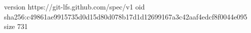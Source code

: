 version https://git-lfs.github.com/spec/v1
oid sha256:c49861ae9915735d0d15d80d078b17d1d12699167a3c42aaf4edcf8f0044e095
size 731
